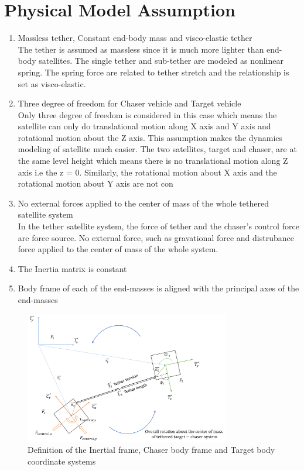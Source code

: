 \section{Physical Model Assumption}

\begin{enumerate}
\label{simu-assumption}
\item Massless tether, Constant end-body mass and visco-elastic tether\\

The tether is assumed as massless since it is much more lighter than end-body satellites.  The single tether and sub-tether are modeled as nonlinear spring. The spring force are related to tether stretch and the relationship is set as visco-elastic.

\item Three degree of freedom for Chaser vehicle and Target vehicle\\

Only three degree of freedom is considered in this case which means the satellite can only do translational motion along X axis and Y axis and rotational motion about the Z axis. This assumption makes the dynamics modeling of satellite much easier. The two satellites, target and chaser, are at the same level height which means there is no translational motion along Z axis i.e the z = 0. Similarly, the rotational motion about X axis and the rotational motion about Y axis are not con
\item No external forces applied to the center of mass of the whole tethered satellite system\\

In the tether satellite system, the force of tether and the chaser's control force are force source. No external force, such as gravational force and distrubance force applied to the center of mass of the whole system. 
\item The Inertia matrix is constant

\item Body frame of each of the end-masses is aligned with the principal axes of the end-masses
\end{enumerate}

\begin{figure}[ht]
\centering
\includegraphics[width=0.8\textwidth,right]{fig/simulation/illustration.png}
\caption{Definition of the Inertial frame, Chaser body frame and Target body coordinate systems}
\label{simu-illustration}
\end{figure}


